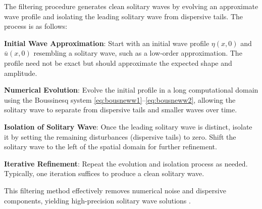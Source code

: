 \documentclass[alpha-refs, 12pt]{wiley-article}
\begin{document}
The filtering procedure generates clean solitary waves by evolving an approximate wave profile and isolating the leading solitary wave from dispersive tails. The process is as follows:
\begin{description}
  \item{\textbf{Initial Wave Approximation}:} Start with an initial wave profile $\eta(x,0)$ and $\bar{u}(x,0)$ resembling a solitary wave, such as a low-order approximation. The profile need not be exact but should approximate the expected shape and amplitude.
  \item{\textbf{Numerical Evolution}:} Evolve the initial profile in a long computational domain using the Boussinesq system \eqref{eq:bousneww1}--\eqref{eq:bousneww2}, allowing the solitary wave to separate from dispersive tails and smaller waves over time.
  \item{\textbf{Isolation of Solitary Wave}:} Once the leading solitary wave is distinct, isolate it by setting the remaining disturbances (dispersive tails) to zero. Shift the solitary wave to the left of the spatial domain for further refinement.
  \item{\textbf{Iterative Refinement}:} Repeat the evolution and isolation process as needed. Typically, one iteration suffices to produce a clean solitary wave.
\end{description}
This filtering method effectively removes numerical noise and dispersive components, yielding high-precision solitary wave solutions \cite{BDM2}.
\end{document}
